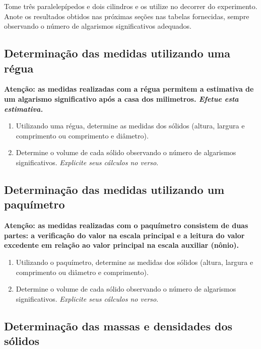 Tome três paralelepípedos e dois cilindros e os utilize no decorrer do experimento. Anote os resultados obtidos nas próximas seções nas tabelas fornecidas, sempre observando o número de algarismos significativos adequados.

\subsection{Determinação das medidas utilizando uma régua}

\textbf{Atenção: as medidas realizadas com a régua permitem a estimativa de um algarismo significativo após a casa dos milimetros. \emph{Efetue esta estimativa.}}

\begin{enumerate}
\item Utilizando uma régua, determine as medidas dos sólidos (altura, largura e comprimento ou comprimento e diâmetro). 
\item Determine o volume de cada sólido observando o número de algarismos significativos. \emph{Explicite seus cálculos no verso}.
\end{enumerate}

\subsection{Determinação das medidas utilizando um paquímetro}

\textbf{Atenção: as medidas realizadas com o paquímetro consistem de duas partes: a verificação do valor na escala principal e a leitura do valor excedente em relação ao valor principal na escala auxiliar (nônio).}

\begin{enumerate}
\item Utilizando o paquímetro, determine as medidas dos sólidos (altura, largura e comprimento ou diâmetro e comprimento). 
\item Determine o volume de cada sólido observando o número de algarismos significativos. \emph{Explicite seus cálculos no verso}.
\end{enumerate}

\subsection{Determinação das massas e densidades dos sólidos}

